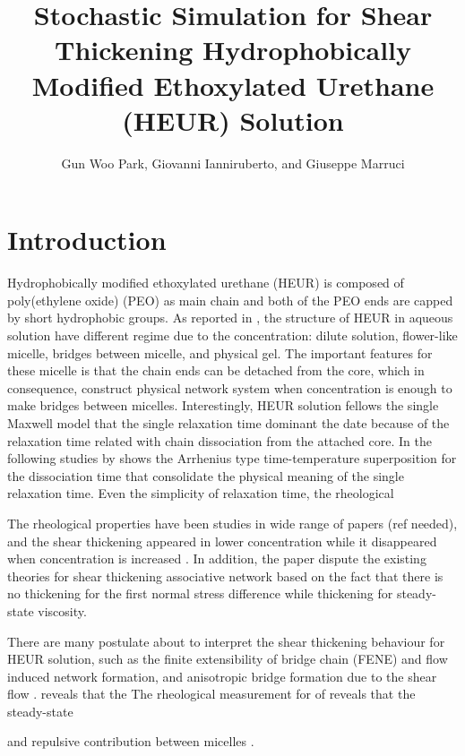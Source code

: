 \documentclass[10pt, a4paper]{article}
\title{Stochastic Simulation for Shear Thickening Hydrophobically Modified Ethoxylated Urethane (HEUR) Solution}
\author{Gun Woo Park, Giovanni Ianniruberto, and Giuseppe Marruci}
\affil{\textit{Dipartimento di Ingegneria Chimica, dei Materiali e della Produzione Industriale, Università degli Studi di Napoli Federico II}}
\begin{document}
\maketitle
\section{Introduction}
Hydrophobically modified ethoxylated urethane (HEUR) is composed of poly(ethylene oxide) (PEO) as main chain and both of the PEO ends are capped by short hydrophobic groups. As reported in \textcite{Xu:1996ke}, the structure of HEUR in aqueous solution have different regime due to the concentration: dilute solution, flower-like micelle, bridges between micelle, and physical gel. The important features for these micelle is that the chain ends can be detached from the core, which in consequence, construct physical network system when concentration is enough to make bridges between micelles. Interestingly, HEUR solution fellows the single Maxwell model \parencite{Annable:1993jd} that the single relaxation time dominant the date because of the relaxation time related with chain dissociation from the attached core. In the following studies by \textcite{Suzuki:2013kk} shows the Arrhenius type time-temperature superposition for the dissociation time that consolidate the physical meaning of the single relaxation time. Even the simplicity of relaxation time, the rheological 

The rheological properties have been studies in wide range of papers (ref needed), and the shear thickening appeared in lower concentration while it disappeared when concentration is increased \parencite{Suzuki:2012gfa}. In addition, the paper dispute the existing theories for shear thickening associative network based on the fact that there is no thickening for the first normal stress difference while thickening for steady-state viscosity. 


There are many postulate about to interpret the shear thickening behaviour for HEUR solution, such as the finite extensibility of bridge chain (FENE) and flow induced network formation, and anisotropic bridge formation due to the shear flow \parencite{Uneyama:2012ge}. \textcite{Suzuki:2013kk} reveals that the 
The rheological measurement for of \textcite{Suzuki:2013kk} reveals that the steady-state 

 and repulsive contribution between micelles \parencite{Ianniruberto:2015dv}.
\end{document}
